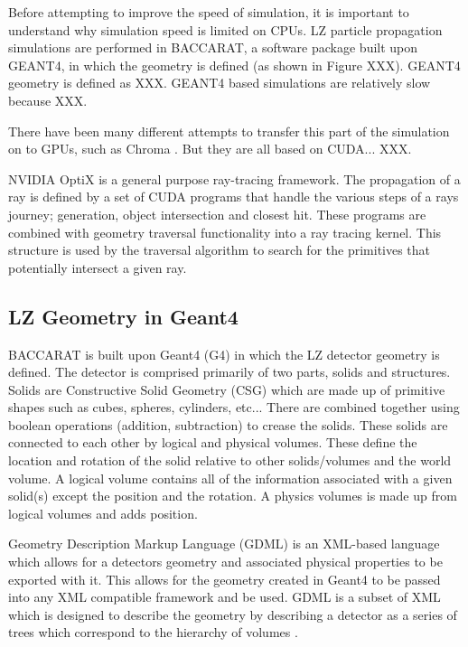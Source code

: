 \par
Before attempting to improve the speed of simulation, it is important to understand why simulation speed is limited on CPUs. 
LZ particle propagation simulations are performed in BACCARAT, a software package built upon GEANT4, in which the geometry is defined (as shown in Figure XXX).
GEANT4 geometry is defined as XXX.
GEANT4 based simulations are relatively slow because XXX.

There have been many different attempts to transfer this part of the simulation on to GPUs, such as Chroma \cite{chroma_presentation_ref}.
But they are all based on CUDA... XXX.



\par
NVIDIA OptiX is a general purpose ray-tracing framework.
The propagation of a ray is defined by a set of CUDA programs that handle the various steps of a rays journey; generation, object intersection and closest hit.
These programs are combined with geometry traversal functionality into a ray tracing kernel. 
This structure is used by the traversal algorithm to search for the primitives that potentially intersect a given ray.



\subsection{LZ Geometry in Geant4}
\par
BACCARAT is built upon Geant4 (G4) in which the LZ detector geometry is defined.
The detector is comprised primarily of two parts, solids and structures.
Solids are Constructive Solid Geometry (CSG) which are made up of primitive shapes such as cubes, spheres, cylinders, etc...
There are combined together using boolean operations (addition, subtraction) to crease the solids.
These solids are connected to each other by logical and physical volumes.
These define the location and rotation of the solid relative to other solids/volumes and the world volume.
A logical volume contains all of the information associated with a given solid(s) except the position and the rotation.
A physics volumes is made up from logical volumes and adds position.

\par
Geometry Description Markup Language (GDML) is an XML-based language which allows for a detectors geometry and associated physical properties to be exported with it.
This allows for the geometry created in Geant4 to be passed into any XML compatible framework and be used.
GDML is a subset of XML which is designed to describe the geometry by describing a detector as a series of trees which correspond to the hierarchy of volumes \cite{GDML_USER_GUIDE_ref}.


